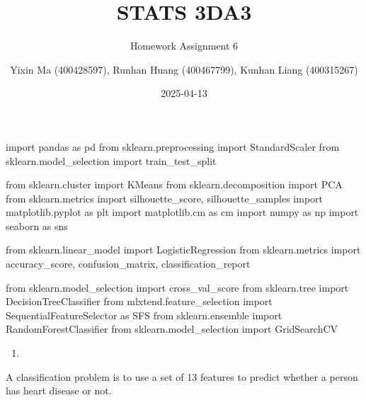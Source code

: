\documentclass[
  11pt,
  letterpaper,
  DIV=11,
  numbers=noendperiod]{scrartcl}
\title{STATS 3DA3}
\subtitle{Homework Assignment 6}
\author{Yixin Ma (400428597), Runhan Huang (400467799), Kunhan Liang
(400315267)}
\date{2025-04-13}
\newenvironment{Shaded}{\begin{snugshade}}{\end{snugshade}}
\newcommand{\ImportTok}[1]{\textcolor[rgb]{0.00,0.46,0.62}{#1}}
\newcommand{\NormalTok}[1]{\textcolor[rgb]{0.00,0.23,0.31}{#1}}
\providecommand{\tightlist}{%
  \setlength{\itemsep}{0pt}\setlength{\parskip}{0pt}}\usepackage{longtable,booktabs,array}
\begin{document}
\maketitle


\newpage

\begin{Shaded}
\begin{Highlighting}[]
\ImportTok{import}\NormalTok{ pandas }\ImportTok{as}\NormalTok{ pd}
\ImportTok{from}\NormalTok{ sklearn.preprocessing }\ImportTok{import}\NormalTok{ StandardScaler}
\ImportTok{from}\NormalTok{ sklearn.model\_selection }\ImportTok{import}\NormalTok{ train\_test\_split}

\ImportTok{from}\NormalTok{ sklearn.cluster }\ImportTok{import}\NormalTok{ KMeans}
\ImportTok{from}\NormalTok{ sklearn.decomposition }\ImportTok{import}\NormalTok{ PCA}
\ImportTok{from}\NormalTok{ sklearn.metrics }\ImportTok{import}\NormalTok{ silhouette\_score, silhouette\_samples}
\ImportTok{import}\NormalTok{ matplotlib.pyplot }\ImportTok{as}\NormalTok{ plt}
\ImportTok{import}\NormalTok{ matplotlib.cm }\ImportTok{as}\NormalTok{ cm}
\ImportTok{import}\NormalTok{ numpy }\ImportTok{as}\NormalTok{ np}
\ImportTok{import}\NormalTok{ seaborn }\ImportTok{as}\NormalTok{ sns}

\ImportTok{from}\NormalTok{ sklearn.linear\_model }\ImportTok{import}\NormalTok{ LogisticRegression}
\ImportTok{from}\NormalTok{ sklearn.metrics }\ImportTok{import}\NormalTok{ accuracy\_score, confusion\_matrix, classification\_report}

\ImportTok{from}\NormalTok{ sklearn.model\_selection }\ImportTok{import}\NormalTok{ cross\_val\_score}
\ImportTok{from}\NormalTok{ sklearn.tree }\ImportTok{import}\NormalTok{ DecisionTreeClassifier}
\ImportTok{from}\NormalTok{ mlxtend.feature\_selection }\ImportTok{import}\NormalTok{ SequentialFeatureSelector }\ImportTok{as}\NormalTok{ SFS}
\ImportTok{from}\NormalTok{ sklearn.ensemble }\ImportTok{import}\NormalTok{ RandomForestClassifier}
\ImportTok{from}\NormalTok{ sklearn.model\_selection }\ImportTok{import}\NormalTok{ GridSearchCV}
\end{Highlighting}
\end{Shaded}

\begin{enumerate}
\def\labelenumi{(\arabic{enumi})}
\tightlist
\item
\end{enumerate}

A classification problem is to use a set of 13 features to predict
whether a person has heart disease or not.
\end{document}

